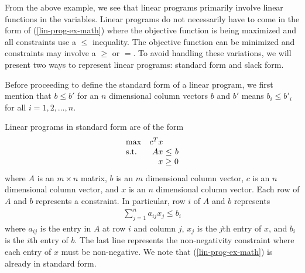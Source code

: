 \documentclass{article}
\begin{document}
From the above example, we see that linear programs primarily involve linear functions in the variables. Linear programs do not necessarily have to come in the form of (\ref{lin-prog-ex-math}) where the objective function is being maximized and all constraints use a $\leq$ inequality. The objective function can be minimized and constraints may involve a $\geq$ or $=$. To avoid handling these variations, we will present two ways to represent linear programs: standard form and slack form. 

Before proceeding to define the standard form of a linear program, we first mention that $b \leq b'$ for an $n$ dimensional column vectors $b$ and $b'$ means $b_i \leq b'_i$ for all $i = 1, 2, \ldots, n$.

Linear programs in standard form are of the form
\begin{equation*}
\setlength\arraycolsep{1.5pt}
  \begin{array}{l@{\quad} r c r} 
    \max          & c^{T}x & & \\
    \mathrm{s.t.} &  Ax & \leq & b \\
                  & x & \geq &  0 \\
  \end{array}
\end{equation*}
where $A$ is an $m \times n$ matrix, $b$ is an $m$ dimensional column vector, $c$ is an $n$ dimensional column vector, and $x$ is an $n$ dimensional column vector. Each row of $A$ and $b$ represents a constraint. In particular, row $i$ of $A$ and $b$ represents
\begin{align*}
    \sum_{j = 1}^n a_{ij} x_j \leq b_i 
\end{align*}
where $a_{ij}$ is the entry in $A$ at row $i$ and column $j$, $x_j$ is the $j$th entry of $x$, and $b_i$ is the $i$th entry of $b$. The last line represents the non-negativity constraint where each entry of $x$ must be non-negative. We note that (\ref{lin-prog-ex-math}) is already in standard form.
\end{document}

